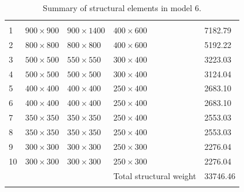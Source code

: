\documentclass{cup-pan}
\begin{document}
\renewcommand{\arraystretch}{1}
\begin{longtable}{P{0.5in} P{1in} P{1in} P{1in} P{1in}}
\caption{Summary of structural elements in model 6.}\\
\headrow {} &  &  &  &  \\
1 & $900\times900$ & $900\times1400$ & $400\times600$ & \num{7182.79} \\
2 & $800\times800$ & $800\times800$ & $400\times600$ & \num{5192.22} \\
3 & $500\times500$ & $550\times550$ & $300\times400$ & \num{3223.03} \\
4 & $500\times500$ & $500\times500$ & $300\times400$ & \num{3124.04} \\
5 & $400\times400$ & $400\times400$ & $250\times400$ & \num{2683.10} \\
6 & $400\times400$ & $400\times400$ & $250\times400$ & \num{2683.10} \\
7 & $350\times350$ & $350\times350$ & $250\times400$ & \num{2553.03} \\
8 & $350\times350$ & $350\times350$ & $250\times400$ & \num{2553.03} \\
9 & $300\times300$ & $300\times300$ & $250\times300$ & \num{2276.04} \\
10 & $300\times300$ & $300\times300$ & $250\times300$ & \num{2276.04} \\
 &  & & Total structural weight & \num{33746.46} \\
\label{tab:cross section model 6}
\end{longtable}
\end{document}

